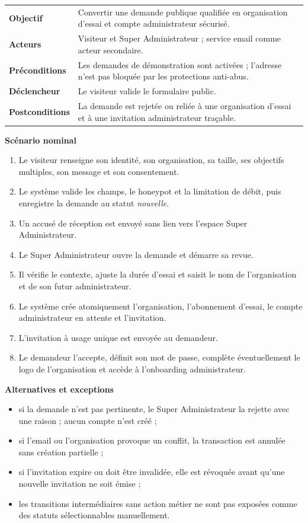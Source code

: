 \begin{table}[H]
  \centering
  \begin{tabularx}{\textwidth}{@{}C{3.3cm}Y@{}}
    \toprule
    \textbf{Objectif} & Convertir une demande publique qualifiée en organisation
    d'essai et compte administrateur sécurisé.\\
    \textbf{Acteurs} & Visiteur et Super Administrateur ; service email comme acteur
    secondaire.\\
    \textbf{Préconditions} & Les demandes de démonstration sont activées ; l'adresse
    n'est pas bloquée par les protections anti-abus.\\
    \textbf{Déclencheur} & Le visiteur valide le formulaire public.\\
    \textbf{Postconditions} & La demande est rejetée ou reliée à une organisation
    d'essai et à une invitation administrateur traçable.\\
    \bottomrule
  \end{tabularx}
\end{table}

\textbf{Scénario nominal}
\begin{enumerate}[leftmargin=8mm]
  \item Le visiteur renseigne son identité, son organisation, sa taille, ses objectifs
  multiples, son message et son consentement.
  \item Le système valide les champs, le honeypot et la limitation de débit, puis
  enregistre la demande au statut \emph{nouvelle}.
  \item Un accusé de réception est envoyé sans lien vers l'espace Super Administrateur.
  \item Le Super Administrateur ouvre la demande et démarre sa revue.
  \item Il vérifie le contexte, ajuste la durée d'essai et saisit le nom de
  l'organisation et de son futur administrateur.
  \item Le système crée atomiquement l'organisation, l'abonnement d'essai, le compte
  administrateur en attente et l'invitation.
  \item L'invitation à usage unique est envoyée au demandeur.
  \item Le demandeur l'accepte, définit son mot de passe, complète éventuellement le
  logo de l'organisation et accède à l'onboarding administrateur.
\end{enumerate}

\textbf{Alternatives et exceptions}
\begin{itemize}[leftmargin=7mm]
  \item si la demande n'est pas pertinente, le Super Administrateur la rejette avec
  une raison ; aucun compte n'est créé ;
  \item si l'email ou l'organisation provoque un conflit, la transaction est annulée
  sans création partielle ;
  \item si l'invitation expire ou doit être invalidée, elle est révoquée avant qu'une
  nouvelle invitation ne soit émise ;
  \item les transitions intermédiaires sans action métier ne sont pas exposées comme
  des statuts sélectionnables manuellement.
\end{itemize}

